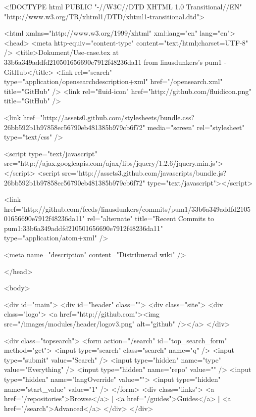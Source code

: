



<!DOCTYPE html PUBLIC "-//W3C//DTD XHTML 1.0 Transitional//EN"
  "http://www.w3.org/TR/xhtml1/DTD/xhtml1-transitional.dtd">

<html xmlns="http://www.w3.org/1999/xhtml" xml:lang="en" lang="en">
  <head>
    <meta http-equiv="content-type" content="text/html;charset=UTF-8" />
    <title>Dokument/Use-case.tex at 33b6a349addfd210501656690e7912f48236da11 from linusdunkers's pum1 - GitHub</title>
    <link rel="search" type="application/opensearchdescription+xml" href="/opensearch.xml" title="GitHub" />
    <link rel="fluid-icon" href="http://github.com/fluidicon.png" title="GitHub" />

    
      <link href="http://assets0.github.com/stylesheets/bundle.css?26bb592b1b97858ec56790eb481385b979cb6f72" media="screen" rel="stylesheet" type="text/css" />
    

    
      
        <script type="text/javascript" src="http://ajax.googleapis.com/ajax/libs/jquery/1.2.6/jquery.min.js"></script>
        <script src="http://assets3.github.com/javascripts/bundle.js?26bb592b1b97858ec56790eb481385b979cb6f72" type="text/javascript"></script>
      
    
    
  
    
  

  <link href="http://github.com/feeds/linusdunkers/commits/pum1/33b6a349addfd210501656690e7912f48236da11" rel="alternate" title="Recent Commits to pum1:33b6a349addfd210501656690e7912f48236da11" type="application/atom+xml" />

  <meta name="description" content="Distribuerad wiki" />


    
  </head>

  

  <body>
    

    <div id="main">
      <div id="header" class="">
        <div class="site">
          <div class="logo">
            <a href="http://github.com"><img src="/images/modules/header/logov3.png" alt="github" /></a>
          </div>
          
            <div class="topsearch">
  <form action="/search" id="top_search_form" method="get">
    <input type="search" class="search" name="q" /> <input type="submit" value="Search" />
    <input type="hidden" name="type" value="Everything" />
    <input type="hidden" name="repo" value="" />
    <input type="hidden" name="langOverride" value="">
    <input type="hidden" name="start_value" value="1" />
  </form>
  <div class="links">
    <a href="/repositories">Browse</a> | <a href="/guides">Guides</a> | <a href="/search">Advanced</a>
  </div>
</div>
            
